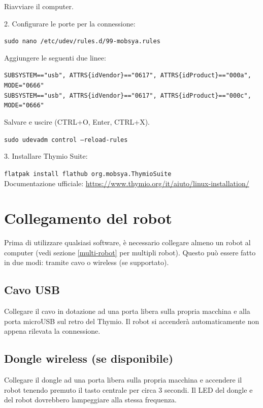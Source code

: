 \documentclass[12pt]{article}
\begin{document}
		Riavviare il computer.
		
		2. Configurare le porte per la connessione:
		
		\texttt{sudo nano /etc/udev/rules.d/99-mobsya.rules}
		
		Aggiungere le seguenti due linee:
		
		\texttt{SUBSYSTEM=="usb", ATTRS\{idVendor\}=="0617", ATTRS\{idProduct\}=="000a", MODE="0666"}\\
		\texttt{SUBSYSTEM=="usb", ATTRS\{idVendor\}=="0617", ATTRS\{idProduct\}=="000c", MODE="0666"}
		
		Salvare e uscire (CTRL+O, Enter,  CTRL+X).

		\texttt{sudo udevadm control --reload-rules}
		
		
		3. Installare Thymio Suite:
		
		\texttt{flatpak install flathub org.mobsya.ThymioSuite}\\
		
	
		Documentazione ufficiale: \url{https://www.thymio.org/it/aiuto/linux-installation/}
			

\section{Collegamento del robot}

	Prima di utilizzare qualsiasi software, è necessario collegare almeno un robot al computer (vedi sezione \ref{multi-robot} per multipli robot). Questo può essere fatto in due modi: tramite cavo o wireless (se supportato).
	
	\subsection{Cavo USB}
	
		Collegare il cavo in dotazione ad una porta libera sulla propria macchina e alla porta microUSB sul retro del Thymio. Il robot si accenderà automaticamente non appena rilevata la connessione.
		
	\subsection{Dongle wireless (se disponibile)}
	
		Collegare il dongle ad una porta libera sulla propria macchina e accendere il robot tenendo premuto il tasto centrale per circa 3 secondi. Il LED del dongle e del robot dovrebbero lampeggiare alla stessa frequenza.
	
\end{document}
